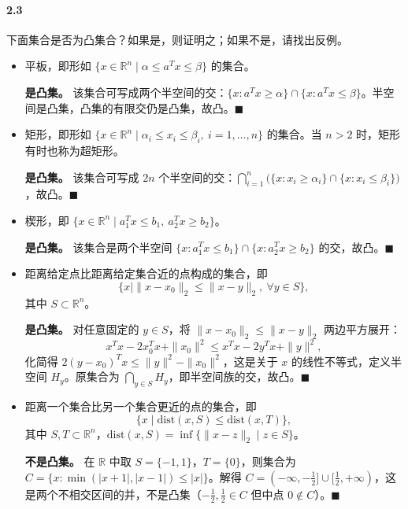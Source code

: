 \documentclass[12pt,a4paper]{article}
\begin{document}
\paragraph{2.3}
下面集合是否为凸集合？如果是，则证明之；如果不是，请找出反例。

\begin{itemize}
  \item[(a)] 平板，即形如 $\{x \in \mathbb{R}^n \mid \alpha \leq a^T x \leq \beta\}$ 的集合。

  \textbf{是凸集。} 该集合可写成两个半空间的交：$\{x:a^Tx\ge\alpha\}\cap\{x:a^Tx\le\beta\}$。半空间是凸集，凸集的有限交仍是凸集，故凸。$\blacksquare$

  \item[(b)] 矩形，即形如 $\{x \in \mathbb{R}^n \mid \alpha_i \leq x_i \leq \beta_i,\ i = 1, \dots, n\}$ 的集合。当 $n > 2$ 时，矩形有时也称为超矩形。

  \textbf{是凸集。} 该集合可写成 $2n$ 个半空间的交：$\bigcap_{i=1}^n\bigl(\{x:x_i\ge\alpha_i\}\cap\{x:x_i\le\beta_i\}\bigr)$，故凸。$\blacksquare$

  \item[(c)] 楔形，即 $\{x \in \mathbb{R}^n \mid a_1^T x \leq b_1,\ a_2^T x \geq b_2\}$。

  \textbf{是凸集。} 该集合是两个半空间 $\{x:a_1^Tx\le b_1\}\cap\{x:a_2^Tx\ge b_2\}$ 的交，故凸。$\blacksquare$

  \item[(d)] 距离给定点比距离给定集合近的点构成的集合，即
  \[
  \{x \mid \|x - x_0\|_2 \leq \|x - y\|_2,\ \forall y \in S\},
  \]
  其中 $S \subset \mathbb{R}^n$。

  \textbf{是凸集。} 对任意固定的 $y\in S$，将 $\|x-x_0\|_2\le\|x-y\|_2$ 两边平方展开：
  \[
    x^Tx - 2x_0^Tx + \|x_0\|^2 \le x^Tx - 2y^Tx + \|y\|^2,
  \]
  化简得 $2(y-x_0)^Tx \le \|y\|^2 - \|x_0\|^2$，这是关于 $x$ 的线性不等式，定义半空间 $H_y$。原集合为 $\bigcap_{y\in S} H_y$，即半空间族的交，故凸。$\blacksquare$

  \item[(e)] 距离一个集合比另一个集合更近的点的集合，即
  \[
  \{x \mid \mathrm{dist}(x, S) \leq \mathrm{dist}(x, T)\},
  \]
  其中 $S, T \subset \mathbb{R}^n$，$\mathrm{dist}(x, S) = \inf\{\|x - z\|_2 \mid z \in S\}$。

  \textbf{不是凸集。} 在 $\mathbb{R}$ 中取 $S=\{-1,1\}$，$T=\{0\}$，则集合为 $C=\{x:\min(|x+1|,|x-1|)\le|x|\}$。解得 $C=(-\infty,-\tfrac{1}{2}]\cup[\tfrac{1}{2},+\infty)$，这是两个不相交区间的并，不是凸集（$-\tfrac{1}{2},\tfrac{1}{2}\in C$ 但中点 $0\notin C$）。$\blacksquare$
\end{itemize}
\end{document}
